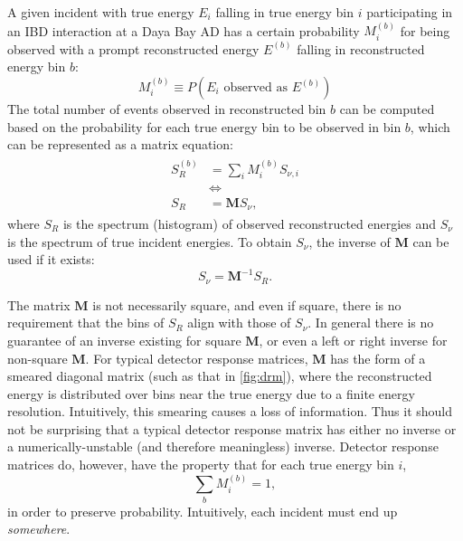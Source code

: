 A given incident \nuebar{} with true energy $E_i$ falling in true energy bin $i$
participating in an IBD interaction at a Daya Bay AD
has a certain probability $M^{(b)}_i$ for being observed
with a prompt reconstructed energy $E^{(b)}$ falling in reconstructed energy bin $b$:
\begin{equation}\label{eq:drm_trad_prob}
    M^{(b)}_i \equiv P(E_i \text{ observed as } E^{(b)})
\end{equation}
The total number of events observed in reconstructed bin $b$
can be computed based on the probability for each true energy bin
to be observed in bin $b$, which can be represented as a matrix equation:
\begin{align}\label{eq:drm_trad_matrix}
    \begin{split}
        S^{(b)}_R &= \sum_i M^{(b)}_i S_{\nu,i} \\
                  &\Leftrightarrow \\
        S_R &= \mathbf{M} S_\nu,
    \end{split}
\end{align}
where $S_R$ is the spectrum (histogram) of observed reconstructed energies
and $S_\nu$ is the spectrum of true incident \nuebar{} energies.
To obtain $S_\nu$, the inverse of $\mathbf{M}$ can be used if it exists:
\begin{equation}
    S_\nu = \mathbf{M}^{-1} S_R.
\end{equation}

The matrix $\mathbf{M}$ is not necessarily square,
and even if square, there is no requirement that
the bins of $S_R$ align with those of $S_\nu$.
In general there is no guarantee of an inverse existing for square $\mathbf{M}$,
or even a left or right inverse for non-square $\mathbf{M}$.
For typical detector response matrices,
$\mathbf{M}$ has the form of a smeared diagonal matrix
(such as that in \cref{fig:drm}),
where the reconstructed energy is distributed over bins near the true energy
due to a finite energy resolution.
Intuitively, this smearing causes a loss of information.
Thus it should not be surprising that a typical detector response matrix
has either no inverse or a numerically-unstable (and therefore meaningless) inverse.
Detector response matrices do, however, have the property
that for each true energy bin $i$,
\begin{equation}\label{eq:drm_trad_unitarity}
    \sum_b M^{(b)}_i = 1,
\end{equation}
in order to preserve probability.
Intuitively, each incident \nuebar{} must end up \emph{somewhere}.

